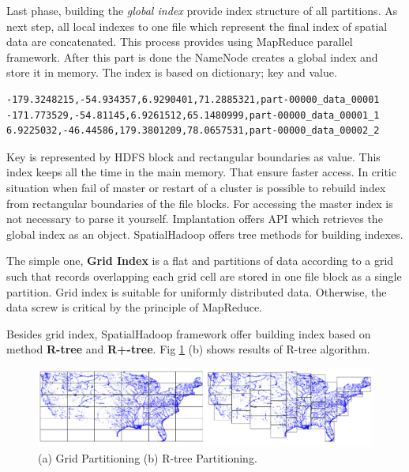 \documentclass[a4paper,12pt,oneside]{report}
\begin{document}
Last phase, building the \textit{global index} provide index structure of all partitions. As next step, 
 all local indexes to one file which represent the final index of spatial data are concatenated. This process 
provides using MapReduce parallel framework.  After this part is done the NameNode creates a global index
and store it in memory. The index is based on dictionary; key and value.

\begin{footnotesize}\begin{lstlisting}[style=mybash]
-179.3248215,-54.934357,6.9290401,71.2885321,part-00000_data_00001
-171.773529,-54.81145,6.9261512,65.1480999,part-00000_data_00001_1
6.9225032,-46.44586,179.3801209,78.0657531,part-00000_data_00002_2
\end{lstlisting}\end{footnotesize}


 Key is represented by HDFS block and  rectangular boundaries as value. This index keeps all the 
 time in the main memory. That ensure faster access. In critic situation when fail of master or 
 restart of a cluster is possible to rebuild index from rectangular boundaries of the file blocks. 
 For accessing the master index is not necessary to parse it yourself. Implantation offers API 
 which retrieves the global index as an object.
SpatialHadoop offers tree methods for building indexes. 

The simple one, \textbf{Grid Index} is a flat and partitions of
data according to a grid such that records overlapping each grid cell are stored in one file block 
as a single partition. Grid index is suitable for uniformly distributed data. Otherwise, the data 
screw is critical by the principle of MapReduce. 

Besides grid index, SpatialHadoop framework offer building index based on method \textbf{R-tree} and 
\textbf{ R+-tree}. Fig \ref{fig:partitioning} (b) shows results of R-tree algorithm. 

  \begin{figure}[h!]
	\centering
    \includegraphics[width=1\textwidth]{./img/spatial_hadoop_parti.png}
    \caption[Spatial Map Reduce]{\centering (a) Grid Partitioning (b) R-tree Partitioning.\footnotemark}
    \label{fig:partitioning}
  \end{figure}  
    
\end{document}
